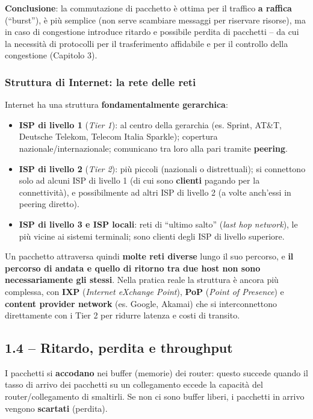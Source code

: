 \documentclass[12pt, a4paper]{article}
\begin{document}
\textbf{Conclusione}: la commutazione di pacchetto è ottima per il traffico \textbf{a raffica} (``burst''), è più semplice (non serve scambiare messaggi per riservare risorse), ma in caso di congestione introduce ritardo e possibile perdita di pacchetti -- da cui la necessità di protocolli per il trasferimento affidabile e per il controllo della congestione (Capitolo 3).

\subsubsection{Struttura di Internet: la rete delle reti}

Internet ha una struttura \textbf{fondamentalmente gerarchica}:

\begin{itemize}
    \item \textbf{ISP di livello 1} (\textit{Tier 1}): al centro della gerarchia (es. Sprint, AT\&T, Deutsche Telekom, Telecom Italia Sparkle); copertura nazionale/internazionale; comunicano tra loro alla pari tramite \textbf{peering}.
    \item \textbf{ISP di livello 2} (\textit{Tier 2}): più piccoli (nazionali o distrettuali); si connettono solo ad alcuni ISP di livello 1 (di cui sono \textbf{clienti} pagando per la connettività), e possibilmente ad altri ISP di livello 2 (a volte anch'essi in peering diretto).
    \item \textbf{ISP di livello 3 e ISP locali}: reti di ``ultimo salto'' (\textit{last hop network}), le più vicine ai sistemi terminali; sono clienti degli ISP di livello superiore.
\end{itemize}

Un pacchetto attraversa quindi \textbf{molte reti diverse} lungo il suo percorso, e \textbf{il percorso di andata e quello di ritorno tra due host non sono necessariamente gli stessi}. Nella pratica reale la struttura è ancora più complessa, con \textbf{IXP} (\textit{Internet eXchange Point}), \textbf{PoP} (\textit{Point of Presence}) e \textbf{content provider network} (es. Google, Akamai) che si interconnettono direttamente con i Tier 2 per ridurre latenza e costi di transito.

\subsection{1.4 -- Ritardo, perdita e throughput}

I pacchetti si \textbf{accodano} nei buffer (memorie) dei router: questo succede quando il tasso di arrivo dei pacchetti su un collegamento eccede la capacità del router/collegamento di smaltirli. Se non ci sono buffer liberi, i pacchetti in arrivo vengono \textbf{scartati} (perdita).
\end{document}
